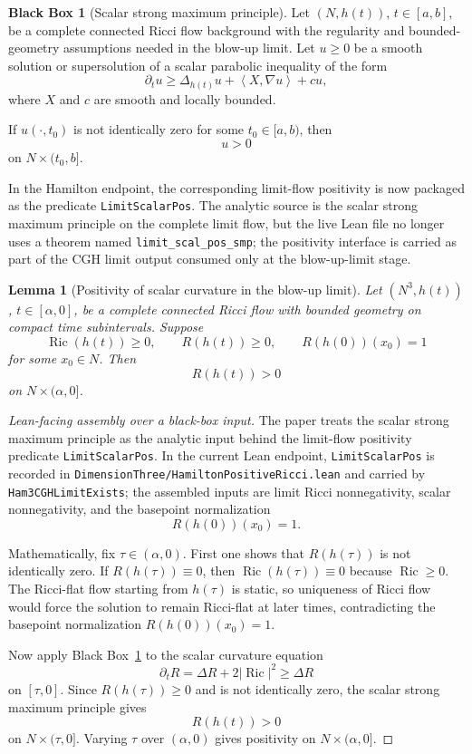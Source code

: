 \documentclass[11pt]{article}
\theoremstyle{plain}
\newtheorem{lemma}[theorem]{Lemma}
\theoremstyle{definition}
\newtheorem{blackbox}[theorem]{Black Box}
\theoremstyle{remark}
\newcommand{\Ric}{\operatorname{Ric}}
\newcommand{\ip}[2]{\left\langle #1,#2\right\rangle}
\newcommand{\norm}[1]{\left|#1\right|}
\newcommand{\leanref}[1]{\nolinkurl{#1}}
\newcommand{\leanfile}[1]{\nolinkurl{#1}}
\newcommand{\rffile}[1]{\leanfile{#1}}
\begin{document}
\begin{blackbox}[Scalar strong maximum principle]
\label{bb:scalar-strong-mp}
Let $(N,h(t))$, $t\in[a,b]$, be a complete connected Ricci flow background
with the regularity and bounded-geometry assumptions needed in the blow-up
limit. Let $u\ge0$ be a smooth solution or supersolution of a scalar parabolic
inequality of the form
\[
\partial_tu\ge \Delta_{h(t)}u+\ip{X}{\nabla u}+cu,
\]
where $X$ and $c$ are smooth and locally bounded.

If $u(\cdot,t_0)$ is not identically zero for some $t_0\in[a,b)$, then
\[
u>0
\]
on $N\times(t_0,b]$.
\end{blackbox}

In the Hamilton endpoint, the corresponding limit-flow positivity is now
packaged as the predicate \leanref{LimitScalarPos}.  The analytic source is the
scalar strong maximum principle on the complete limit flow, but the live Lean
file no longer uses a theorem named \texttt{limit\_scal\_pos\_smp}; the positivity
interface is carried as part of the CGH limit output consumed only at the
blow-up-limit stage.

\begin{lemma}[Positivity of scalar curvature in the blow-up limit]
\label{lem:limit-scalar-positive}
Let $(N^3,h(t))$, $t\in[\alpha,0]$, be a complete connected Ricci flow with
bounded geometry on compact time subintervals. Suppose
\[
\Ric(h(t))\ge0,
\qquad
R(h(t))\ge0,
\qquad
R(h(0))(x_0)=1
\]
for some $x_0\in N$. Then
\[
R(h(t))>0
\]
on $N\times(\alpha,0]$.
\end{lemma}

\begin{proof}[Lean-facing assembly over a black-box input]
The paper treats the scalar strong maximum principle as the analytic input
behind the limit-flow positivity predicate \leanref{LimitScalarPos}.  In the
current Lean endpoint, \leanref{LimitScalarPos} is recorded in
\rffile{DimensionThree/HamiltonPositiveRicci.lean} and carried by
\leanref{Ham3CGHLimitExists}; the assembled inputs are limit Ricci
nonnegativity, scalar nonnegativity, and the basepoint normalization
\[
  R(h(0))(x_0)=1.
\]

Mathematically, fix $\tau\in(\alpha,0)$.  First one shows that
$R(h(\tau))$ is not identically zero.  If $R(h(\tau))\equiv0$, then
$\Ric(h(\tau))\equiv0$ because $\Ric\ge0$.  The Ricci-flat flow starting from
$h(\tau)$ is static, so uniqueness of Ricci flow would force the solution to
remain Ricci-flat at later times, contradicting the basepoint normalization
$R(h(0))(x_0)=1$.

Now apply Black Box~\ref{bb:scalar-strong-mp} to the scalar curvature equation
\[
  \partial_tR=\Delta R+2\norm{\Ric}^2\ge\Delta R
\]
on $[\tau,0]$.  Since $R(h(\tau))\ge0$ and is not identically zero, the scalar
strong maximum principle gives
\[
  R(h(t))>0
\]
on $N\times(\tau,0]$.  Varying $\tau$ over $(\alpha,0)$ gives positivity on
$N\times(\alpha,0]$.
\end{proof}
\end{document}
